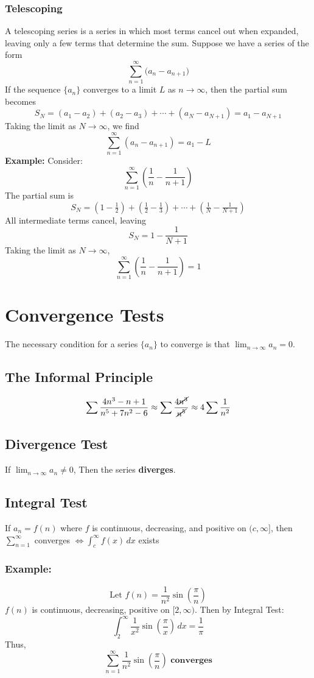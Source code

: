 \documentclass[11pt]{article}
\begin{document}
\subsubsection*{Telescoping}
A telescoping series is a series in which most terms cancel out when expanded, leaving only a few terms that determine the sum.  
Suppose we have a series of the form
\[
    \sum_{n=1}^{\infty} \big( a_n - a_{n+1} \big)
\]
If the sequence $\{a_n\}$ converges to a limit $L$ as $n \to \infty$, then the partial sum becomes
\[
    S_N = (a_1 - a_2) + (a_2 - a_3) + \cdots + (a_N - a_{N+1}) = a_1 - a_{N+1}
\]
Taking the limit as $N \to \infty$, we find
\[
    \sum_{n=1}^{\infty} (a_n - a_{n+1}) = a_1 - L
\]
\textbf{Example:}
Consider:
\[
    \sum_{n=1}^{\infty} \left( \frac{1}{n} - \frac{1}{n+1} \right)
\]
The partial sum is
\[
    S_N = \left(1 - \tfrac{1}{2}\right) + \left(\tfrac{1}{2} - \tfrac{1}{3}\right) + \cdots + \left(\tfrac{1}{N} - \tfrac{1}{N+1}\right)
\]
All intermediate terms cancel, leaving
\[
    S_N = 1 - \frac{1}{N+1}
\]
Taking the limit as $N \to \infty$,
\[
    \sum_{n=1}^{\infty} \left( \frac{1}{n} - \frac{1}{n+1} \right) = 1
\]
\section{Convergence Tests}
The necessary condition for a series $\{a_n\}$ to converge is that $\displaystyle\lim_{n\to\infty}a_n=0$.
\subsection{The Informal Principle}
\[
  \sum\frac{4n^3-n+1}{n^5+7n^2-6}\approx\sum\frac{4\cancel{n^3}}{\cancel{n^5}}\approx 4\sum\frac{1}{n^2}
\]
\subsection{Divergence Test}
If $\displaystyle\lim_{n\to\infty}a_n\neq0$, Then the series \textbf{diverges}.
\subsection{Integral Test}
If $a_n=f(n)$ where $f$ is continuous, decreasing, and positive on $(c,\infty]$, then $\displaystyle\sum_{n=1}^\infty$ converges $\displaystyle \iff\int_c^\infty f(x)\,dx$ exists
\subsubsection*{Example:}
\[
  \text{Let }f(n)=\frac{1}{n^2}\sin(\frac{\pi}{n})
\]
$f(n)$ is continuous, decreasing, positive on $[2,\infty)$. Then by Integral Test:
\[
  \int_{2}^{\infty}\frac{1}{x^2}\sin(\frac{\pi}{x})\,dx=\frac{1}{\pi}
\]
Thus,
\[
  \sum_{n=1}^\infty \frac{1}{n^2}\sin(\frac{\pi}{n})\textbf{ converges}
\]
\end{document}
